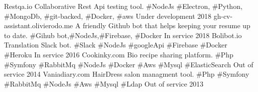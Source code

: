 
\begin{cvhonors}

  \cvhonor
    {Restqa.io} %
    {Collaborative Rest Api testing tool. \#NodeJs \#Electron, \#Python,  \#MongoDb, \#git-backed, \#Docker, \#aws}
    {Under development} %
    {2018} %
  \cvhonor
    {gh-cv-assistant.olivierodo.me} %
    {A friendly Github bot that helps keeping your resume up to date. \#Gihub bot,\#NodeJs,\#Firebase, \#Docker}
    {In service} %
    {2018} %
  \cvhonor
    {Bolibot.io} %
    {Translation Slack bot.  \#Slack \#NodeJs \#googleApi \#Firebase \#Docker \#Heroku}
    {In service} %
    {2016} %
  \cvhonor
    {Cookinky.com} %
    {Bio recipe sharing platform. \#Php \#Symfony \#RabbitMq \#NodeJs  \#Docker \#Aws \#Mysql \#ElasticSearch}
    {Out of service} %
    {2014} %
  \cvhonor
    {Vaniadiary.com} %
    {HairDress salon managment tool. \#Php \#Symfony \#RabbitMq \#NodeJs \#Aws \#Mysql \#Ldap}
    {Out of service} %
    {2013} %

\end{cvhonors}
